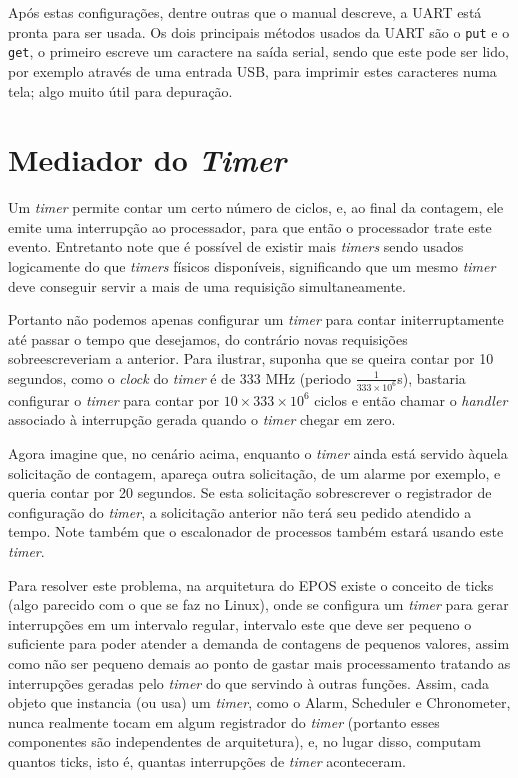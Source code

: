 Após estas configurações, dentre outras que o manual descreve, a UART está pronta para ser usada. Os dois principais métodos usados da UART são o \verb+put+ e o \verb+get+, o primeiro escreve um caractere na saída serial, sendo que este pode ser lido, por exemplo através de uma entrada USB, para imprimir estes caracteres numa tela; algo muito útil para depuração.


\section{Mediador do \emph{Timer}}

Um \emph{timer} permite contar um certo número de ciclos, e, ao final da contagem, ele emite uma interrupção ao processador, para que então o processador trate este evento. Entretanto note que é possível de existir mais \emph{timers} sendo usados logicamente do que \emph{timers} físicos disponíveis, significando que um mesmo \emph{timer} deve conseguir servir a mais de uma requisição simultaneamente.

Portanto não podemos apenas configurar um \emph{timer} para contar initerruptamente até passar o tempo que desejamos, do contrário novas requisições sobreescreveriam a anterior. Para ilustrar, suponha que se queira contar por 10 segundos, como o \emph{clock} do \emph{timer} é de 333 MHz (periodo $\frac{1}{333 \times 10^6}$s), bastaria configurar o \emph{timer} para contar por $10 \times 333 \times 10^6$ ciclos e então chamar o \emph{handler} associado à interrupção gerada quando o \emph{timer} chegar em zero.

Agora imagine que, no cenário acima, enquanto o \emph{timer} ainda está servido àquela solicitação de contagem, apareça outra solicitação, de um alarme por exemplo, e queria contar por 20 segundos. Se esta solicitação sobrescrever o registrador de configuração do \emph{timer}, a solicitação anterior não terá seu pedido atendido a tempo. Note também que o escalonador de processos também estará usando este \emph{timer}.

Para resolver este problema, na arquitetura do EPOS existe o conceito de ticks (algo parecido com o que se faz no Linux), onde se configura um \emph{timer} para gerar interrupções em um intervalo regular, intervalo este que deve ser pequeno o suficiente para poder atender a demanda de contagens de pequenos valores, assim como não ser pequeno demais ao ponto de gastar mais processamento tratando as interrupções geradas pelo \emph{timer} do que servindo à outras funções. Assim, cada objeto que instancia (ou usa) um \emph{timer}, como o Alarm, Scheduler e Chronometer, nunca realmente tocam em algum registrador do \emph{timer} (portanto esses componentes são independentes de arquitetura), e, no lugar disso, computam quantos ticks, isto é, quantas interrupções de \emph{timer} aconteceram.

